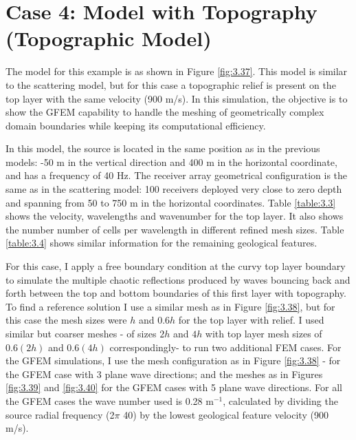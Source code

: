 \clearpage

\section{Case 4: Model with Topography (Topographic Model)}
The model for this example is as shown in Figure \ref{fig:3.37}. This model is similar to the scattering model, but for this case a topographic relief is present on the top layer with the same velocity (900 m/s).
In this simulation, the objective is to show the GFEM capability to handle the meshing of geometrically complex domain boundaries while keeping its computational efficiency.

In this model, the source is located in the same position as in the previous models: -50 m in the vertical direction and 400 m in the horizontal coordinate, and has a frequency of 40 Hz. The receiver array geometrical configuration is the same as in the scattering model: 100 receivers deployed very close to zero depth and spanning from 50 to 750 m in the horizontal coordinates. Table \ref{table:3.3} shows the velocity, wavelengths and wavenumber for the top layer. It also shows the number number of cells per wavelength in different refined mesh sizes. Table \ref{table:3.4} shows similar information for the remaining geological features.

For this case, I apply a free boundary condition at the curvy top layer boundary to simulate the multiple chaotic reflections produced by waves bouncing back and forth between the top and bottom boundaries of this first layer with topography.
To find a reference solution I use a similar mesh as in Figure \ref{fig:3.38}, but for this case the mesh sizes were $h$ and $0.6 h$ for the top layer with relief. I used similar but coarser meshes - of sizes $2h$ and $4h$ with top layer mesh sizes of $0.6 (2h)$ and $0.6 (4h)$ correspondingly- to run two additional FEM cases. For the GFEM simulations, I use the mesh configuration as in Figure \ref{fig:3.38} - for the GFEM case with 3 plane wave directions; and the meshes as in Figures \ref{fig:3.39} and \ref{fig:3.40} for the GFEM cases with 5 plane wave directions. For all the GFEM cases the wave number used is 0.28 m$^{-1}$, calculated by dividing the source radial frequency (2$\pi$ 40) by the lowest geological feature velocity (900 m/s).

